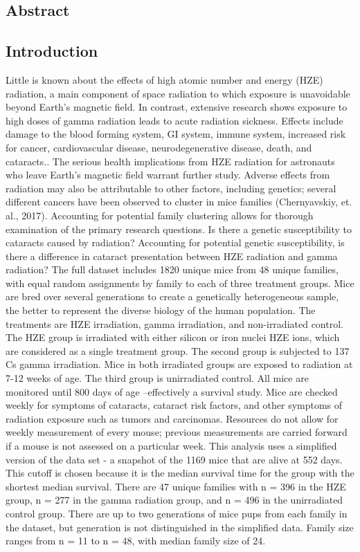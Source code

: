 \documentclass[
]{article}
\begin{document}
\hypertarget{abstract}{%
\subsection{Abstract}\label{abstract}}

\hypertarget{introduction}{%
\subsection{Introduction}\label{introduction}}

Little is known about the effects of high atomic number and energy (HZE)
radiation, a main component of space radiation to which exposure is
unavoidable beyond Earth's magnetic field. In contrast, extensive
research shows exposure to high doses of gamma radiation leads to acute
radiation sickness. Effects include damage to the blood forming system,
GI system, immune system, increased risk for cancer, cardiovascular
disease, neurodegenerative disease, death, and cataracts.. The serious
health implications from HZE radiation for astronauts who leave Earth's
magnetic field warrant further study. Adverse effects from radiation may
also be attributable to other factors, including genetics; several
different cancers have been observed to cluster in mice families
(Chernyavskiy, et. al., 2017). Accounting for potential family
clustering allows for thorough examination of the primary research
questions. Is there a genetic susceptibility to cataracts caused by
radiation? Accounting for potential genetic susceptibility, is there a
difference in cataract presentation between HZE radiation and gamma
radiation? The full dataset includes 1820 unique mice from 48 unique
families, with equal random assignments by family to each of three
treatment groups. Mice are bred over several generations to create a
genetically heterogeneous sample, the better to represent the diverse
biology of the human population. The treatments are HZE irradiation,
gamma irradiation, and non-irradiated control. The HZE group is
irradiated with either silicon or iron nuclei HZE ions, which are
considered as a single treatment group. The second group is subjected to
137 Cs gamma irradiation. Mice in both irradiated groups are exposed to
radiation at 7-12 weeks of age. The third group is unirradiated control.
All mice are monitored until 800 days of age --effectively a survival
study. Mice are checked weekly for symptoms of cataracts, cataract risk
factors, and other symptoms of radiation exposure such as tumors and
carcinomas. Resources do not allow for weekly measurement of every
mouse; previous measurements are carried forward if a mouse is not
assessed on a particular week. This analysis uses a simplified version
of the data set - a snapshot of the 1169 mice that are alive at 552
days. This cutoff is chosen because it is the median survival time for
the group with the shortest median survival. There are 47 unique
families with n = 396 in the HZE group, n = 277 in the gamma radiation
group, and n = 496 in the unirradiated control group. There are up to
two generations of mice pups from each family in the dataset, but
generation is not distinguished in the simplified data. Family size
ranges from n = 11 to n = 48, with median family size of 24.
\end{document}
